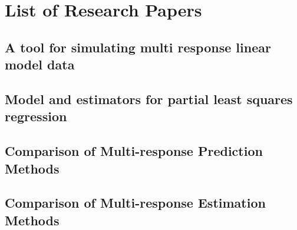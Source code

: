 \documentclass[11pt,twoside,openright,titlepage,
  headinclude,footinclude,BCOR=5mm,
  numbers=noenddot,cleardoublepage=empty,
  tablecaptionabove, dottedtoc,
  bibliography=totoc,paper=a4]{scrreprt}
\begin{document}
\hypertarget{refs}{}

  \renewcommand\bibname{References}
  


\nocite{*}

\appendix
\part*{List of Research Papers}
\par\chapter{A tool for simulating multi response linear model data}
\cleardoublepage

%
\par\chapter{Model and estimators for partial least squares regression}
\cleardoublepage

%
\par\chapter{Comparison of Multi-response Prediction Methods}
\cleardoublepage

%
\par\chapter{Comparison of Multi-response Estimation Methods}
\cleardoublepage

%

\end{document}
